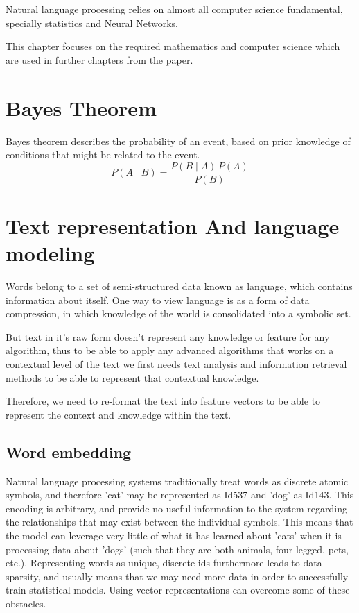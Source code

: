 Natural language processing relies on almost all computer science fundamental, specially statistics and Neural Networks.

This chapter focuses on the required mathematics and computer science which are used in further chapters from the paper.

\section{Bayes Theorem}

Bayes theorem describes the probability of an event, based on prior knowledge of conditions that might be related to the event.
$$ P(A \mid B) = \frac{P(B \mid A) \, P(A)}{P(B)} $$


\section{Text representation And language modeling}

Words belong to a set of semi-structured data known as language, which contains information about itself.
One way to view language is as a form of data compression, in which knowledge of the world is consolidated into a symbolic set.

But text in it's raw form doesn't represent any knowledge or feature for any algorithm, thus to be able to apply any advanced algorithms that works on a contextual level of the text we first needs text analysis and information retrieval methods to be able to represent that contextual knowledge.

Therefore, we need to re-format the text into feature vectors to be able to represent the context and knowledge within the text.

\vspace{.5cm}

\subsection{Word embedding}

Natural language processing systems traditionally treat words as discrete atomic symbols, and therefore 'cat' may be represented as Id537 and 'dog' as Id143. This encoding is arbitrary, and provide no useful information to the system regarding the relationships that may exist between the individual symbols. This means that the model can leverage very little of what it has learned about 'cats' when it is processing data about 'dogs' (such that they are both animals, four-legged, pets, etc.). Representing words as unique, discrete ids furthermore leads to data sparsity, and usually means that we may need more data in order to successfully train statistical models. Using vector representations can overcome some of these obstacles.

